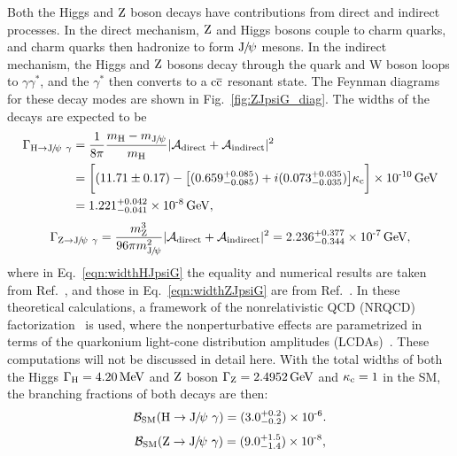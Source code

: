 Both the Higgs and $\mathrm{Z}$ boson decays have contributions from direct and indirect processes. In the direct mechanism, $\mathrm{Z}$ and Higgs bosons couple to charm quarks, and charm quarks then hadronize to form ${\mathrm{J}\hspace{-.08em}/\hspace{-.14em}\psi}$ mesons. 
In the indirect mechanism, the Higgs and $\mathrm{Z}$ bosons decay through the quark and W boson loops to 
$\gamma\gamma^{*}$, and the $\gamma^{*}$ then converts to a $\mathrm{c}\overline{\mathrm{c}}$ resonant state.  
The Feynman diagrams for these decay modes are shown in Fig.~\ref{fig:ZJpsiG_diag}. 
The widths of the decays are expected to be
\begin{equation}
\label{eqn:widthHJpsiG}
\begin{split}
\Gamma_{\mathrm{H}\to{\mathrm{J}\hspace{-.08em}/\hspace{-.14em}\psi}\ \gamma} & =\frac{1}{8\pi}\frac{m_{\mathrm{H}}-m_{{\mathrm{J}\hspace{-.08em}/\hspace{-.14em}\psi}}}{m_{\mathrm{H}}} |\mathcal{A}_{\text{direct}}+\mathcal{A}_{\text{indirect}}|^{2} \\
& = \bigg[(11.71\pm 0.17) - \big[(0.659^{+0.085}_{-0.085})+i(0.073^{+0.035}_{-0.035})\big]\kappa_{\mathrm{c}}\bigg]\times \text{10}^\text{-10}\,\text{Ge\hspace{-.08em}V} \\
& =1.221^{+0.042}_{-0.041}\times \text{10}^\text{-8}\,\text{Ge\hspace{-.08em}V},
\end{split}
\end{equation}
\begin{equation}
\label{eqn:widthZJpsiG}
\Gamma_{\mathrm{Z}\to{\mathrm{J}\hspace{-.08em}/\hspace{-.14em}\psi}\ \gamma}=\frac{m_{\mathrm{Z}}^{3}}{96\pi m_{{\mathrm{J}\hspace{-.08em}/\hspace{-.14em}\psi}}^{2}} |\mathcal{A}_{\text{direct}}+\mathcal{A}_{\text{indirect}}|^{2}= 2.236^{+0.377}_{-0.344}\times \text{10}^\text{-7}\,\text{Ge\hspace{-.08em}V},
\end{equation}
where in Eq.~\ref{eqn:widthHJpsiG} the equality and numerical results are taken from Ref.~\cite{Bodwin:2013gca,Bodwin:2017wdu}, and those in Eq.~\ref{eqn:widthZJpsiG} are from Ref.~\cite{Bodwin:2017pzj}.
In these theoretical calculations, a framework of the nonrelativistic QCD (NRQCD) factorization~\cite{PhysRevD.51.1125} is used, where the nonperturbative effects are parametrized in terms of the quarkonium light-cone distribution amplitudes (LCDAs)~\cite{PhysRevD.22.2157,Chernyak:1983ej}. These computations will not be discussed in detail here. 
With the total widths of both the Higgs $\Gamma_{\mathrm{H}}=4.20\,\text{Me\hspace{-.08em}V}$ and $\mathrm{Z}$ boson $\Gamma_{\mathrm{Z}}=2.4952\,\text{Ge\hspace{-.08em}V}$ and $\kappa_{\mathrm{c}}=1$ in the SM, the branching fractions of both decays are then:
\begin{equation}
\mathcal{B}_{\text{SM}}(\PH\to\JPsi\ \gamma)=(3.0^{+0.2}_{-0.2})\ten{-6}.
\end{equation}
\begin{equation}
\mathcal{B}_{\text{SM}}(\cPZ\to\JPsi\ \gamma)=(9.0^{+1.5}_{-1.4})\ten{-8},
\end{equation}

